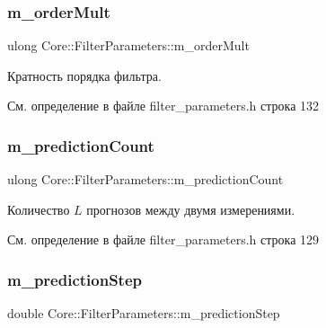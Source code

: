 \hypertarget{class_core_1_1_filter_parameters_abbf3de6b71f358870d750c829d1ef4ea}{}\label{class_core_1_1_filter_parameters_abbf3de6b71f358870d750c829d1ef4ea} 
\subsubsection{\texorpdfstring{m\+\_\+order\+Mult}{m\_orderMult}}
{\footnotesize\ttfamily ulong Core\+::\+Filter\+Parameters\+::m\+\_\+order\+Mult\hspace{0.3cm}{\ttfamily [private]}}

Кратность порядка фильтра. 

См. определение в файле filter\+\_\+parameters.\+h строка 132

\hypertarget{class_core_1_1_filter_parameters_a6b692ee25b7554649a81c073c009855a}{}\label{class_core_1_1_filter_parameters_a6b692ee25b7554649a81c073c009855a} 
\subsubsection{\texorpdfstring{m\+\_\+prediction\+Count}{m\_predictionCount}}
{\footnotesize\ttfamily ulong Core\+::\+Filter\+Parameters\+::m\+\_\+prediction\+Count\hspace{0.3cm}{\ttfamily [private]}}

Количество $L$ прогнозов между двумя измерениями. 

См. определение в файле filter\+\_\+parameters.\+h строка 129

\hypertarget{class_core_1_1_filter_parameters_a1d15be069d981b8f7e1252cb0fd8970d}{}\label{class_core_1_1_filter_parameters_a1d15be069d981b8f7e1252cb0fd8970d} 
\subsubsection{\texorpdfstring{m\+\_\+prediction\+Step}{m\_predictionStep}}
{\footnotesize\ttfamily double Core\+::\+Filter\+Parameters\+::m\+\_\+prediction\+Step\hspace{0.3cm}{\ttfamily [private]}}

